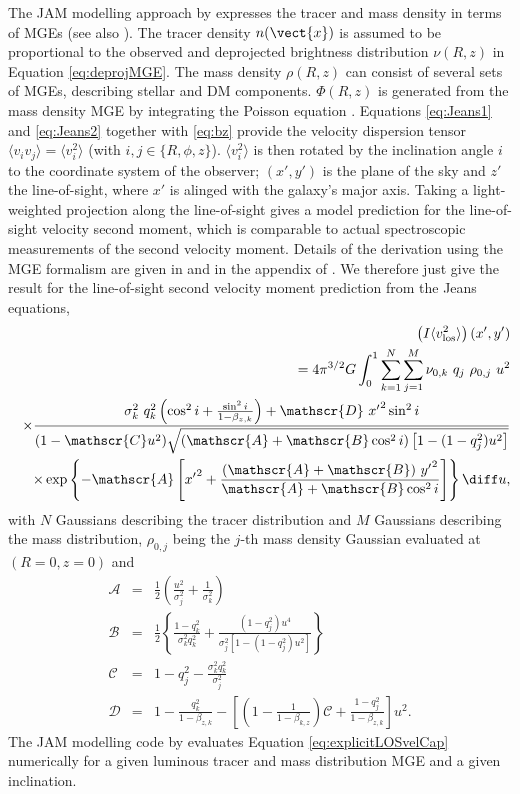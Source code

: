 The JAM modelling approach by \citet{Cap08} expresses the tracer and mass density in terms of MGEs (see also \citealt{1994A&A...285..723E}). The tracer density $n(\vect{x})$ is assumed to be proportional to the observed and deprojected brightness distribution $\nu(R,z)$ in Equation \eqref{eq:deprojMGE}. The mass density $\rho(R,z)$ can consist of several sets of MGEs, describing stellar and DM components. $\Phi(R,z)$ is generated from the mass density MGE by integrating the Poisson equation \citep{1994A&A...285..723E}. Equations \eqref{eq:Jeans1} and \eqref{eq:Jeans2} together with \eqref{eq:bz} provide the velocity dispersion tensor $\langle v_i v_j \rangle = \langle v_i^2 \rangle$ (with $i,j \in \{ R,\phi, z\}$). $\langle v_i^2 \rangle$ is then rotated by the inclination angle $i$ to the coordinate system of the observer; $(x',y')$ is the plane of the sky and $z'$ the line-of-sight, where $x'$ is alinged with the galaxy's major axis. Taking a light-weighted projection along the line-of-sight gives a model prediction for the line-of-sight velocity second moment, which is comparable to actual spectroscopic measurements of the second velocity moment. Details of the derivation using the MGE formalism are given in \citet{Cap08} and in the appendix of \citet{GlennEC}. We therefore just give the result for the line-of-sight second velocity moment prediction from the Jeans equations,
\begin{eqnarray}
&&\left(I \langle v_\text{los}^2\rangle\right)(x',y')\nonumber\\
&&= 4 \pi^{3/2} G \int_0^1 \sum_{k=1}^N \sum_{j=1}^M \nu_{0,k} \ q_j \ \rho_{0,j} \ u^2\nonumber\\
&& \times \frac{\sigma_k^2 \ q^{2}_k \left( \cos^2 i + \frac{\sin^2 i}{1-\beta_{z,k}}\right) + \mathscr{D} \  {x'}^{2} \sin^2 i}{(1-\mathscr{C}u^2) \sqrt{(\mathscr{A} + \mathscr{B} \cos^2 i) \left[1-(1-q^{2}_j) u^2 \right]}}\nonumber\\
&& \times \exp\left\{- \mathscr{A} \left[{x'}^{2} + \frac{(\mathscr{A}+\mathscr{B}) \ {y'}^{2}}{\mathscr{A}+\mathscr{B}\cos^2 i}\right] \right\} \diff u, \label{eq:explicitLOSvelCap}
\end{eqnarray}
with $N$ Gaussians describing the tracer distribution and $M$ Gaussians describing the mass distribution, $\rho_{0,j}$ being the $j$-th mass density Gaussian evaluated at $(R=0,z=0)$ and
\begin{eqnarray*}
\mathscr{A} &=& \frac 12 \left(\frac{u^2}{\sigma_j^2} + \frac{1}{\sigma_k^2} \right)\nonumber\\
\mathscr{B} &=& \frac 12 \left\{\frac{1-q^{2}_k}{\sigma_k^2 q^{2}_k} + \frac{(1-q^{2}_j)u^4}{\sigma_j^2 \left[1-(1-{q}_j^{2})u^2 \right]} \right\}\nonumber\\
\mathscr{C} &=& 1- q^{2}_j - \frac{\sigma_k^2 q^{2}_k}{\sigma^2_j}\nonumber\\
\mathscr{D} &=& 1 - \frac{q^{2}_k}{1-\beta_{z,k}} - \left[ \left(1-\frac{1}{1-\beta_{k,z}}\right)\mathscr{C} + \frac{1-q^{2}_j}{1-\beta_{z,k}}\right] u^2.\nonumber
\end{eqnarray*}
The JAM modelling code by \citet{Cap08} evaluates Equation \eqref{eq:explicitLOSvelCap} numerically for a given luminous tracer and mass distribution MGE and a given inclination.


